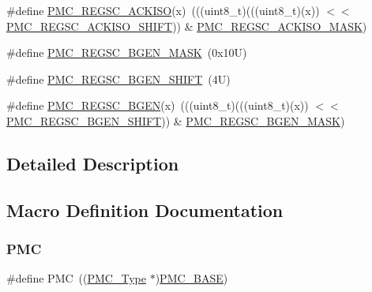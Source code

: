 \begin{DoxyCompactItemize}
\item 
\#define \mbox{\hyperlink{group___p_m_c___register___masks_ga3267bf5ad24a6ff2fced59c01f98c652}{P\+M\+C\+\_\+\+R\+E\+G\+S\+C\+\_\+\+A\+C\+K\+I\+SO}}(x)~(((uint8\+\_\+t)(((uint8\+\_\+t)(x)) $<$$<$ \mbox{\hyperlink{group___p_m_c___register___masks_gad2b9b6ce6aa455e8607fd3c2d1647544}{P\+M\+C\+\_\+\+R\+E\+G\+S\+C\+\_\+\+A\+C\+K\+I\+S\+O\+\_\+\+S\+H\+I\+FT}})) \& \mbox{\hyperlink{group___p_m_c___register___masks_ga35ced6f0f133b2d5892bdcba3e0b2832}{P\+M\+C\+\_\+\+R\+E\+G\+S\+C\+\_\+\+A\+C\+K\+I\+S\+O\+\_\+\+M\+A\+SK}})
\item 
\#define \mbox{\hyperlink{group___p_m_c___register___masks_ga7e1520a56f4d2675018d5efaa9492f19}{P\+M\+C\+\_\+\+R\+E\+G\+S\+C\+\_\+\+B\+G\+E\+N\+\_\+\+M\+A\+SK}}~(0x10\+U)
\item 
\#define \mbox{\hyperlink{group___p_m_c___register___masks_gab43d258e6864ee3a7a728de1d720f6fe}{P\+M\+C\+\_\+\+R\+E\+G\+S\+C\+\_\+\+B\+G\+E\+N\+\_\+\+S\+H\+I\+FT}}~(4\+U)
\item 
\#define \mbox{\hyperlink{group___p_m_c___register___masks_ga2823482fbfe8289abb28701a85bd3539}{P\+M\+C\+\_\+\+R\+E\+G\+S\+C\+\_\+\+B\+G\+EN}}(x)~(((uint8\+\_\+t)(((uint8\+\_\+t)(x)) $<$$<$ \mbox{\hyperlink{group___p_m_c___register___masks_gab43d258e6864ee3a7a728de1d720f6fe}{P\+M\+C\+\_\+\+R\+E\+G\+S\+C\+\_\+\+B\+G\+E\+N\+\_\+\+S\+H\+I\+FT}})) \& \mbox{\hyperlink{group___p_m_c___register___masks_ga7e1520a56f4d2675018d5efaa9492f19}{P\+M\+C\+\_\+\+R\+E\+G\+S\+C\+\_\+\+B\+G\+E\+N\+\_\+\+M\+A\+SK}})
\end{DoxyCompactItemize}


\subsection{Detailed Description}


\subsection{Macro Definition Documentation}
\mbox{\label{group___p_m_c___register___masks_ga979c6d379c67bc2f3e8eb6efcb509f69}} 
\subsubsection{\texorpdfstring{P\+MC}{PMC}}
{\footnotesize\ttfamily \#define P\+MC~((\mbox{\hyperlink{struct_p_m_c___type}{P\+M\+C\+\_\+\+Type}} $\ast$)\mbox{\hyperlink{group___p_m_c___register___masks_ga4e92bd47dc68cc81e62c344586a4cdfa}{P\+M\+C\+\_\+\+B\+A\+SE}})}

